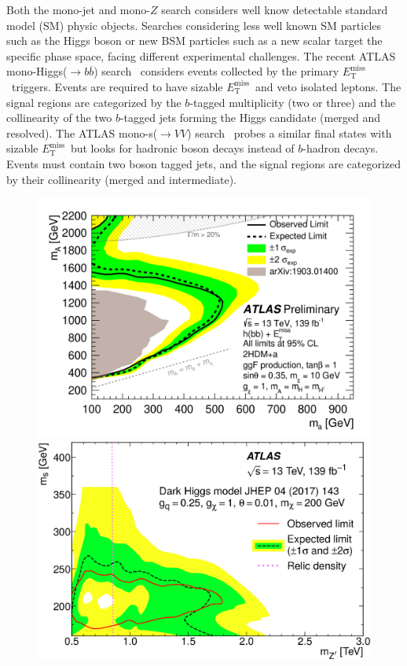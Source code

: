 \documentclass{moriond}
\def\et{E_\textrm{T}^{\textrm{miss}}}
\begin{document}
Both the mono-jet and mono-$Z$ search considers well know detectable standard
model (SM) physic objects. Searches considering less well known SM particles
such as the Higgs boson or new BSM particles such as a new scalar target the
specific phase space, facing different experimental challenges. The recent
ATLAS mono-Higgs($\rightarrow b\overline{b}$) search~\cite{monoh} considers events collected by the
primary $\et$\ triggers. Events are required to have sizable $\et$\ and veto
isolated leptons. The signal regions are categorized by the $b$-tagged
multiplicity (two or three) and the collinearity of the two $b$-tagged jets
forming the Higgs candidate (merged and resolved). The ATLAS
mono-s($\rightarrow VV$) search~\cite{monos} probes a similar final states with sizable
$\et$\ but looks for hadronic boson decays instead of $b$-hadron decays. Events
must contain two boson tagged jets, and the signal regions are categorized by
their collinearity (merged and intermediate).    

\begin{figure} [htb]
\begin{minipage}{0.45\linewidth}
\centerline{\includegraphics[width=0.9\linewidth]{monoh}}
\end{minipage}
\begin{minipage}{0.45\linewidth}
\centerline{\includegraphics[width=0.9\linewidth]{monos}}
\end{minipage}
\caption[]{}
\label{fig:mono_h_s}
\end{figure}
\end{document}
